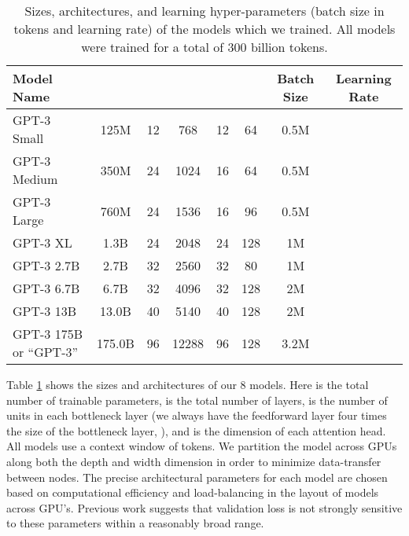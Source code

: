 \documentclass{article}
\begin{document}
\begin{table}
    
    \begin{adjustwidth}{-.8in}{-.8in}
    \begin{center}
        
        \begin{tabular}{l c c c c c c c}
        \toprule
        Model Name &  &  &  &  &   & Batch Size & Learning Rate \\
        \midrule
GPT-3 Small & 125M & 12 & 768 & 12 & 64 & 0.5M &  \\                              
GPT-3 Medium & 350M & 24 & 1024 & 16 & 64 & 0.5M &  \\                             
GPT-3 Large & 760M & 24 & 1536 & 16 & 96 & 0.5M &  \\                             
GPT-3 XL & 1.3B & 24 & 2048 & 24 & 128 & 1M &  \\                            
GPT-3 2.7B   & 2.7B & 32 & 2560 & 32 & 80 & 1M &  \\                             
GPT-3 6.7B   & 6.7B & 32 & 4096 & 32 & 128 & 2M &  \\                            
GPT-3 13B  & 13.0B & 40 & 5140 & 40 & 128 & 2M &  \\                           
GPT-3 175B or ``GPT-3'' & 175.0B & 96 & 12288 & 96 & 128 & 3.2M &  \\
        \bottomrule
        \end{tabular}
    \end{center}
    \end{adjustwidth}
    \caption{Sizes, architectures, and learning hyper-parameters (batch size in tokens and learning rate) of the models which we trained. All models were trained for a total of 300 billion tokens.}
    \label{table:param}
\end{table} 
Table \ref{table:param} shows the sizes and architectures of our 8 models.  Here  is the total number of trainable parameters,  is the total number of layers,  is the number of units in each bottleneck layer (we always have the feedforward layer four times the size of the bottleneck layer,  ), and  is the dimension of each attention head.  All models use a context window of  tokens.  We partition the model across GPUs along both the depth and width dimension in order to minimize data-transfer between nodes. The precise architectural parameters for each model are chosen based on computational efficiency and load-balancing in the layout of models across GPU’s.  Previous work \cite{kaplan2020scaling} suggests that validation loss is not strongly sensitive to these parameters within a reasonably broad range.
\end{document}
